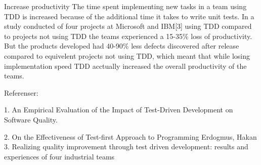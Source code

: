 Increase productivity
The time spent implementing new tasks in a team using TDD is increased because of the additional time it takes to write unit tests. In a study conducted of four projects at Microsoft and IBM[3] using TDD compared to projects not using TDD the teams experienced a 15-35\% loss of productivity. But the products developed had 40-90\% less defects discovered after release compared to equivelent projects not using TDD, which meant that while losing implementation speed TDD acctually increased the overall productivity of the teams.

Referenser:

1. 	An Empirical Evaluation of the Impact of
	Test-Driven Development on Software Quality.

2.	On the Effectiveness of Test-first Approach to Programming
	Erdogmus, Hakan
3.	Realizing quality improvement through test driven
	development: results and experiences of four industrial
	teams



